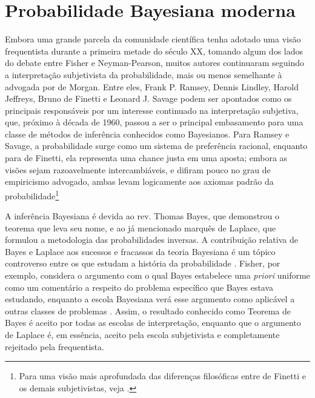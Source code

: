 \section{Probabilidade Bayesiana moderna}\label{sec:bayes}

Embora uma grande parcela da comunidade científica tenha adotado uma visão frequentista durante a primeira metade do século XX,
tomando algum dos lados do debate entre Fisher e Neyman-Pearson, muitos autores continuaram seguindo a interpretação 
subjetivista da probabilidade, mais ou menos semelhante à advogada por de Morgan. Entre eles, Frank P. Ramsey, Dennis Lindley,
Harold Jeffreys, Bruno de Finetti e Leonard J. Savage
podem ser apontados como os principais responsáveis por um interesse continuado na interpretação subjetiva, que, próximo à
década de 1960, passou a ser o principal embasamento para uma classe de métodos de inferência conhecidos como Bayesianos. 
Para Ramsey e Savage, a probabilidade surge como um sistema de preferência racional, enquanto para de Finetti, ela representa
uma chance justa em uma aposta; embora as visões sejam razoavelmente intercambiáveis, e difiram pouco 
no grau de empiricismo advogado,
ambas levam logicamente aos axiomas padrão da probabilidade\footnote{Para uma visão mais aprofundada das diferenças
filosóficas entre de Finetti e os demais subjetivistas, veja \citep{Galavotti89}.}

A inferência Bayesiana é devida ao rev. Thomas Bayes, que demonstrou o teorema que leva seu nome, e ao já mencionado marquês de
Laplace, que formulou a metodologia das probabilidades inversas. A contribuição relativa de Bayes e Laplace aos sucessos
e fracassos da teoria Bayesiana é um tópico controverso	entre os que estudam a história da probabilidade \citep{Zabell09}.
Fisher, por exemplo, considera o argumento com o qual Bayes estabelece uma {\em priori} uniforme como um comentário
a respeito do problema específico que Bayes estava estudando, enquanto a escola Bayesiana verá esse argumento
como aplicável a outras classes de problemas \citep{Aldrich08}. Assim, o resultado conhecido como Teorema de Bayes é aceito
por todas as escolas de interpretação, enquanto que o argumento de Laplace 
é, em essência, aceito pela escola subjetivista e completamente
rejeitado pela frequentista. %

